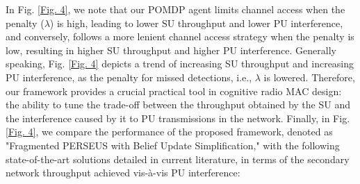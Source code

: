 \documentclass[10pt, twocolumn]{IEEEtran}
\begin{document}
In Fig. \ref{Fig. 4}, we note that our POMDP agent limits channel access when the penalty ($\lambda$) is high, leading to lower SU throughput and lower PU interference, and conversely, follows a more lenient channel access strategy when the penalty is low, resulting in higher SU throughput and higher PU interference. Generally speaking, Fig. \ref{Fig. 4} depicts a trend of increasing SU throughput and increasing PU interference, as the penalty for missed detections, i.e., $\lambda$ is lowered. Therefore, our framework provides a crucial practical tool in cognitive radio MAC design: the ability to tune the trade-off between the throughput obtained by the SU and the interference caused by it to PU transmissions in the network. Finally, in Fig. \ref{Fig. 4}, we compare the performance of the proposed framework, denoted as "Fragmented PERSEUS with Belief Update Simplification," with the following state-of-the-art solutions detailed in current literature, in terms of the secondary network throughput achieved vis-à-vis PU interference:
\end{document}
